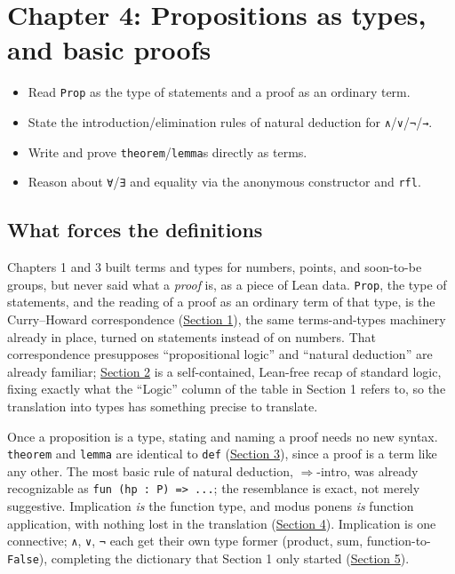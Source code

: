 \chapter{Chapter 4: Propositions as types, and basic proofs}\label{sec:04-propositions-and-proofs:00-index:1}

\begin{learningobjectives}
\begin{itemize}
\tightlist
\item
  Read \texttt{Prop} as the type of statements and a proof as an ordinary term.
\item
  State the introduction/elimination rules of natural deduction for \texttt{∧}/\texttt{∨}/\texttt{¬}/\texttt{→}.
\item
  Write and prove \texttt{theorem}/\texttt{lemma}s directly as terms.
\item
  Reason about \texttt{∀}/\texttt{∃} and equality via the anonymous constructor and \texttt{rfl}.
\end{itemize}
\end{learningobjectives}


\section*{What forces the definitions}\label{sec:04-propositions-and-proofs:00-index:2}

Chapters 1 and 3 built terms and types for numbers, points, and soon-to-be groups, but never said what a \emph{proof} is, as a piece of Lean data. \texttt{Prop}, the type of statements, and the reading of a proof as an ordinary term of that type, is the Curry--Howard correspondence (\hyperref[sec:04-propositions-and-proofs:01-prop:1]{Section 1}), the same terms-and-types machinery already in place, turned on statements instead of on numbers. That correspondence presupposes ``propositional logic'' and ``natural deduction'' are already familiar; \hyperref[sec:04-propositions-and-proofs:02-logic-recap:1]{Section 2} is a self-contained, Lean-free recap of standard logic, fixing exactly what the ``Logic'' column of the table in Section 1 refers to, so the translation into types has something precise to translate.

Once a proposition is a type, stating and naming a proof needs no new syntax. \texttt{theorem} and \texttt{lemma} are identical to \texttt{def} (\hyperref[sec:04-propositions-and-proofs:03-theorem-lemma:1]{Section 3}), since a proof is a term like any other. The most basic rule of natural deduction, \(\Rightarrow\)-intro, was already recognizable as \texttt{fun (hp : P) => ...}; the resemblance is exact, not merely suggestive. Implication \emph{is} the function type, and modus ponens \emph{is} function application, with nothing lost in the translation (\hyperref[sec:04-propositions-and-proofs:04-implication:1]{Section 4}). Implication is one connective; \texttt{∧}, \texttt{∨}, \texttt{¬} each get their own type former (product, sum, function-to-\texttt{False}), completing the dictionary that Section 1 only started (\hyperref[sec:04-propositions-and-proofs:05-and-or-not:1]{Section 5}).

